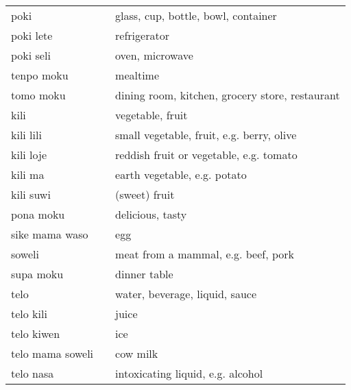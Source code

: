 \begin{supertabular}{p{4,5cm}|ll}
    poki                            &  & glass, cup, bottle, bowl, container                    \\
    poki lete                       &  & refrigerator                                           \\
    poki seli                       &  & oven, microwave                                        \\
    tenpo moku                      &  & mealtime                                               \\
    tomo moku                       &  & dining room, kitchen, grocery store, restaurant        \\
    kili                            &  & vegetable, fruit                                       \\
    kili lili                       &  & small vegetable, fruit, e.g. berry, olive              \\
    kili loje                       &  & reddish fruit or vegetable, e.g. tomato                \\
    kili ma                         &  & earth vegetable, e.g. potato                           \\
    kili suwi                       &  & (sweet) fruit                                          \\
    pona moku                       &  & delicious, tasty                                       \\
    sike mama waso                  &  & egg                                                    \\
    soweli                          &  & meat from a mammal, e.g. beef, pork                    \\
    supa moku                       &  & dinner table                                           \\
    telo                            &  & water, beverage, liquid, sauce                         \\
    telo kili                       &  & juice                                                  \\
    telo kiwen                      &  & ice                                                    \\
    telo mama soweli                &  & cow milk                                               \\
    telo nasa                       &  & intoxicating liquid, e.g. alcohol                      \\

\end{supertabular}
